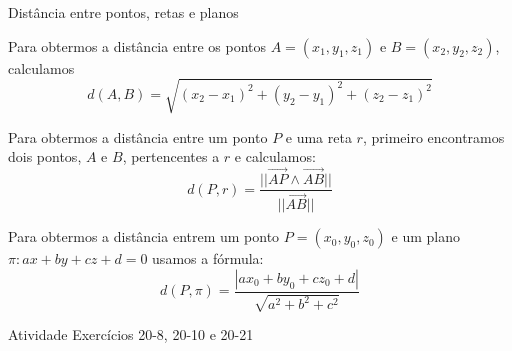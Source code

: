 \begin{frame}{Distância entre pontos, retas e planos}
    \begin{tcolorbox}[colback=magenta!10]
        Para obtermos a distância entre os pontos \(A=(x_1,y_1,z_1)\) e \(B=(x_2,y_2,z_2)\), 
        calculamos
        \[
            d(A,B)=\sqrt{(x_2-x_1)^2+(y_2-y_1)^2+(z_2-z_1) ^2}
        \]
    \end{tcolorbox}
    \pause
    \begin{tcolorbox}[colback=blue!10]
        Para obtermos a distância entre um ponto \(P\) e uma reta \(r\), primeiro
        encontramos dois pontos, \(A\) e \(B\), pertencentes a \(r\) e calculamos:
        \[
            d(P,r) = \frac{||\vec{AP}\wedge \vec{AB}||}{||\vec{AB}||}
        \]
    \end{tcolorbox}
    \pause
    \begin{tcolorbox}[colback=green!10]
        Para obtermos a distância entrem um ponto \(P=(x_0,y_0,z_0)\) e um 
        plano \(\pi: ax+by+cz+d=0\) usamos a fórmula:
        \[
        \displaystyle d(P,\pi) = \frac{|ax_0+by_0+cz_0+d|}{\sqrt{a^2+b^2+c^2}}
    \]
    \end{tcolorbox}
    \vspace{-3pt} %
\end{frame}

\begin{frame}{Atividade}
    Exercícios 20-8, 20-10 e 20-21
\end{frame}
